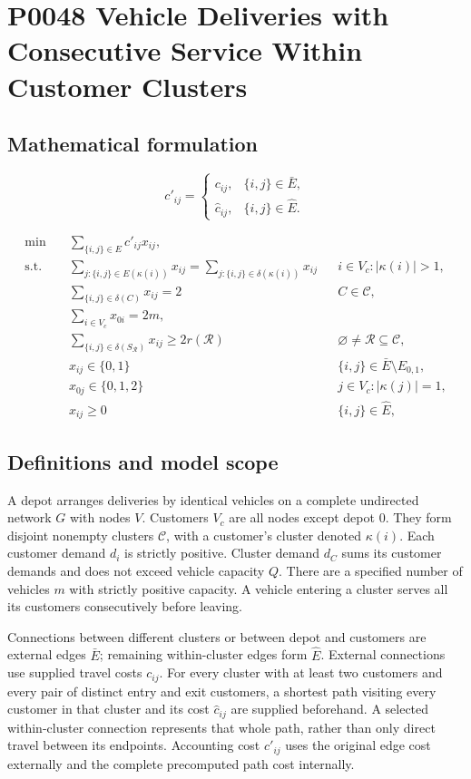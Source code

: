 \documentclass[10pt]{article}
\begin{document}
\section*{P0048 Vehicle Deliveries with Consecutive Service Within Customer Clusters}
\subsection*{Mathematical formulation}
\[
 c'_{ij}=\begin{cases}c_{ij},&\{i,j\}\in\bar E,\\\hat c_{ij},&\{i,j\}\in\hat E.\end{cases}
\]

\begin{align}
\min\quad &\sum_{\{i,j\}\in E}c'_{ij}x_{ij},\tag{8}\\
\text{s.t.}\quad&\sum_{j:\{i,j\}\in E(\kappa(i))}x_{ij}=\sum_{j:\{i,j\}\in\delta(\kappa(i))}x_{ij} &&i\in V_c:|\kappa(i)|>1,\tag{9}\\
&\sum_{\{i,j\}\in\delta(C)}x_{ij}=2 &&C\in\mathcal C,\tag{10}\\
&\sum_{i\in V_c}x_{0i}=2m,\tag{11}\\
&\sum_{\{i,j\}\in\delta(S_{\mathcal R})}x_{ij}\ge2r(\mathcal R) &&\varnothing\ne\mathcal R\subseteq\mathcal C,\tag{12}\\
&x_{ij}\in\{0,1\} &&\{i,j\}\in\bar E\setminus E_{0,1},\tag{13}\\
&x_{0j}\in\{0,1,2\} &&j\in V_c:|\kappa(j)|=1,\tag{14}\\
&x_{ij}\ge0 &&\{i,j\}\in\hat E,\tag{15}
\end{align}

\subsection*{Definitions and model scope}
A depot arranges deliveries by identical vehicles on a complete undirected network $G$ with nodes $V$. Customers $V_c$ are all nodes except depot $0$. They form disjoint nonempty clusters $\mathcal C$, with a customer's cluster denoted $\kappa(i)$. Each customer demand $d_i$ is strictly positive. Cluster demand $d_C$ sums its customer demands and does not exceed vehicle capacity $Q$. There are a specified number of vehicles $m$ with strictly positive capacity. A vehicle entering a cluster serves all its customers consecutively before leaving.

Connections between different clusters or between depot and customers are external edges $\bar E$; remaining within-cluster edges form $\hat E$. External connections use supplied travel costs $c_{ij}$. For every cluster with at least two customers and every pair of distinct entry and exit customers, a shortest path visiting every customer in that cluster and its cost $\hat c_{ij}$ are supplied beforehand. A selected within-cluster connection represents that whole path, rather than only direct travel between its endpoints. Accounting cost $c'_{ij}$ uses the original edge cost externally and the complete precomputed path cost internally.
\end{document}
